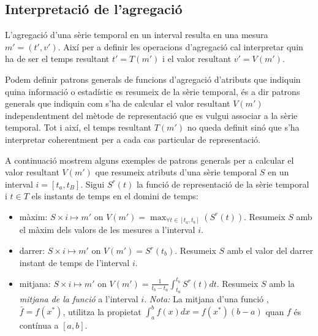 \subsection{Interpretació de l'agregació}


L'agregació d'una sèrie temporal en un interval resulta en una mesura
$m'=(t',v')$. Així per a definir les operacions d'agregació cal
interpretar quin ha de ser el temps resultant $t'=T(m')$ i el valor
resultant $v'=V(m')$.


Podem definir patrons generals de funcions d'agregació d'atributs que
indiquin quina informació o estadístic es resumeix de la sèrie
temporal, és a dir patrons generals que indiquin com s'ha de calcular
el valor resultant $V(m')$ independentment del mètode de representació
que es vulgui associar a la sèrie temporal.  Tot i així, el temps
resultant $T(m')$ no queda definit sinó que s'ha interpretar
coherentment per a cada cas particular de representació.


A continuació mostrem alguns exemples de patrons generals per a
calcular el valor resultant $V(m')$ que resumeix atributs d'una sèrie
temporal $S$ en un interval $i=[t_a,t_B]$. Sigui $S^r(t)$ la funció de
representació de la sèrie temporal i $t\in T$ els instants de temps
en el domini de temps:
\begin{itemize}
\item màxim: $S \times i \mapsto m'$ on $V(m') = \max_{\forall t \in
    [t_a,t_b]}(S^r(t))$. Resumeix $S$ amb el màxim dels valors de les
  mesures a l'interval $i$.
\item darrer: $S \times i \mapsto m'$ on $V(m') = S^r(t_b)$. Resumeix
  $S$ amb el valor del darrer instant de temps de l'interval $i$.

\item mitjana: $S \times i \mapsto m'$ on $V(m') = \frac{1}{t_b-t_a}
  \int_{t_a}^{t_b} S^r(t)dt$. Resumeix $S$ amb la \emph{mitjana de la
    funció} a l'interval $i$. \emph{Nota:} La mitjana d'una
  funció \parencite{weisstein:averagefunction}, $\bar f=f(x^*)$,
  utilitza la propietat $\int_a^b f(x)dx = f(x^*)(b-a)$ quan $f$ és
  contínua a $[a,b]$.

\end{itemize}




